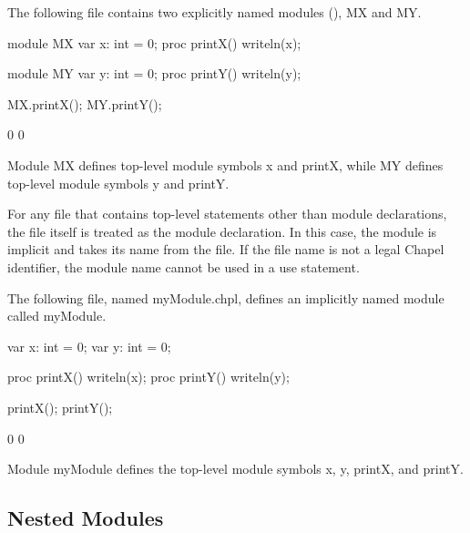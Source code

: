 \begin{example}
The following file contains two explicitly named modules
(), MX and MY.
\begin{chapelpre}
\end{chapelpre}
\begin{chapel}
module MX {
  var x: int = 0;
  proc printX() {
    writeln(x);
  }
}

module MY {
  var y: int = 0;
  proc printY() {
    writeln(y);
  }
}
\end{chapel}
\begin{chapelpost}
MX.printX();
MY.printY();
\end{chapelpost}
\begin{chapeloutput}
0
0
\end{chapeloutput}
Module MX defines top-level module symbols x and printX, while MY
defines top-level module symbols y and printY.
\end{example}

For any file that contains top-level statements other than module
declarations, the file itself is treated as the module declaration.
In this case,
the module is implicit and takes its name from the file.  If the file name is
not a legal Chapel identifier, the module name cannot be used in a use
statement.

\begin{example}
The following file, named myModule.chpl, defines an implicitly named
module called myModule.
\begin{chapelpre}
\end{chapelpre}
\begin{chapel}
var x: int = 0;
var y: int = 0;

proc printX() {
  writeln(x);
}
proc printY() {
  writeln(y);
}
\end{chapel}
\begin{chapelpost}
printX();
printY();
\end{chapelpost}
\begin{chapeloutput}
0
0
\end{chapeloutput}
Module myModule defines the top-level module symbols x, y, printX, and
printY.
\end{example}


\subsection{Nested Modules}
\label{Nested_Modules}


